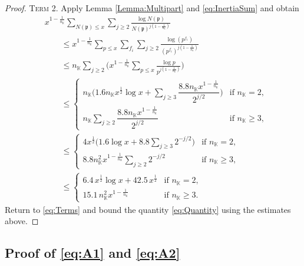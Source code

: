 \documentclass[10pt,reqno]{amsart}
\theoremstyle{plain}
\theoremstyle{definition}
\newcommand{\K}{\mathbb{K}}
\newcommand{\PP}{\mathfrak{p}}
\begin{document}
\begin{proof}
\medskip\noindent\textsc{Term 2.}
Apply Lemma \ref{Lemma:Multipart} and \eqref{eq:InertiaSum} and obtain
\begin{align*}
&x^{1 - \frac{1}{n_{\K}}}\sum_{N(\PP)\leq x}  \sum_{j\geq 2} \frac{\log{N(\PP)} }{N(\PP)^{j(1 - \frac{1}{n_{\K}})}}  \\
&\qquad \leq x^{1 - \frac{1}{n_{\K}}}\sum_{p\leq x} \sum_{f_i} \sum_{j\geq 2}
\frac{\log (p^{f_i}) }{(p^{f_i})^{j(1 - \frac{1}{n_{\K}})}} \\
&\qquad \leq n_{\K}\sum_{j\geq 2} \bigg( x^{1 - \frac{1}{n_{\K}}}\sum_{p \leq x} \frac{\log p}{p^{j(1 - \frac{1}{n_{\K}})}}\bigg) \\
&\qquad \leq 
\begin{cases}
 \displaystyle n_{\K}\Bigg( 1.6n_{\K}x^{ \frac{1}{2} }\log x +\sum_{j\geq 3}\dfrac{8.8n_{\K} x^{1 - \frac{1}{n_{\K}}} }{2^{j/2}}  \Bigg)
 & \text{if $n_{\K} = 2$}, \\
 n_{\K} \displaystyle\sum_{j\geq 2}\dfrac{8.8n_{\K} x^{1 - \frac{1}{n_{\K}}} }{2^{j/2}}  
 & \text{if $n_{\K} \geq 3$},
\end{cases}
 \\
&\qquad \leq 
\begin{cases}
 \displaystyle 4x^{\frac{1}{2}} \bigg( 1.6\log x +8.8  \sum_{j\geq 3}2^{-j/2}  \bigg)
 & \text{if $n_{\K} = 2$}, \\[5pt]
 \displaystyle 8.8 n_{\K}^2 x^{1 - \frac{1}{n_{\K}}}\sum_{j\geq 2}2^{-j/2}
 & \text{if $n_{\K} \geq 3$},
\end{cases}
 \\
&\qquad \leq 
\begin{cases}
 \displaystyle 6.4\,x^{ \frac{1}{2} }\log x +42.5\,x^{\frac{1}{2}}   
 & \text{if $n_{\K} = 2$}, \\[3pt]
 \displaystyle 15.1 \,n_{\K}^2 x^{1 - \frac{1}{n_{\K}}}
 & \text{if $n_{\K} \geq 3$}.
\end{cases}
\end{align*}
Return to \eqref{eq:Terms} and bound the quantity \eqref{eq:Quantity} using the estimates above.
\end{proof}

\subsection{Proof of \eqref{eq:A1} and \eqref{eq:A2}}\label{Section:Proof:A}
\end{document}
